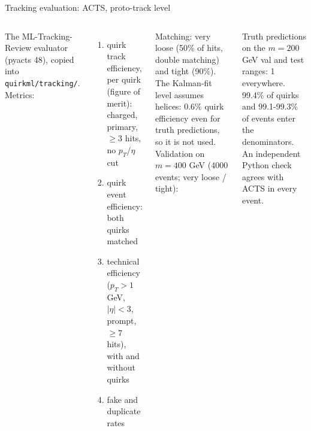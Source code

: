 \documentclass[aspectratio=169,10pt]{beamer}
\begin{document}
\begin{frame}{Tracking evaluation: ACTS, proto-track level}
\begin{columns}[T]
\footnotesize
The ML-Tracking-Review evaluator (pyacts 48), copied into \texttt{quirkml/tracking/}. Metrics:
\begin{enumerate}
\item quirk track efficiency, per quirk (figure of merit): charged, primary, $\ge 3$ hits, no $p_T$/$\eta$ cut
\item quirk event efficiency: both quirks matched
\item technical efficiency ($p_T > 1$ GeV, $|\eta| < 3$, prompt, $\ge 7$ hits), with and without quirks
\item fake and duplicate rates
\end{enumerate}
Matching: very loose (50\% of hits, double matching) and tight (90\%). The Kalman-fit level assumes helices: 0.6\% quirk efficiency even for truth predictions, so it is not used.
\footnotesize
Validation on $m = 400$ GeV (4000 events; very loose / tight):

\vspace{0.3em}

\vspace{0.5em}
Truth predictions on the $m = 200$ GeV val and test ranges: 1 everywhere. 99.4\% of quirks and 99.1-99.3\% of events enter the denominators. An independent Python check agrees with ACTS in every event.
\end{columns}
\end{frame}
\end{document}
